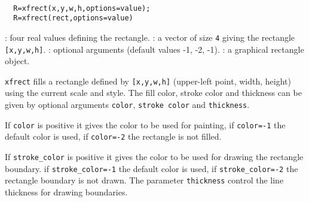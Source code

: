 \begin{mandesc}
  \\ %
\end{mandesc}
\begin{calling_sequence}
\begin{verbatim}
  R=xfrect(x,y,w,h,options=value);
  R=xfrect(rect,options=value) 
\end{verbatim}
\end{calling_sequence}

\begin{parameters}
  \begin{varlist}
    : four real values defining the rectangle.
    : a vector of size \verb!4! giving the rectangle
    \verb![x,y,w,h]!.
    : optional arguments (default values -1, -2, -1).
    : a graphical rectangle object.
  \end{varlist}
\end{parameters}

\begin{mandescription}
  \verb!xfrect! fills a rectangle defined by \verb![x,y,w,h]! 
  (upper-left point, width, height) using the current scale and style.
  The fill color, stroke color and thickness can be given by optional arguments
  \verb!color!, \verb!stroke color! and \verb!thickness!. 

  If \verb!color! is positive it gives the color to be used for painting,
  if \verb!color=-1! the default color is used, if  \verb!color=-2! the
  rectangle is not filled.

  If \verb!stroke_color! is positive it gives the color to be used for drawing the rectangle 
  boundary. if \verb!stroke_color=-1! the default color is used, if  \verb!stroke_color=-2! the rectangle 
  boundary is not drawn. The parameter \verb!thickness! control the line thickness for drawing boundaries.
\end{mandescription}

